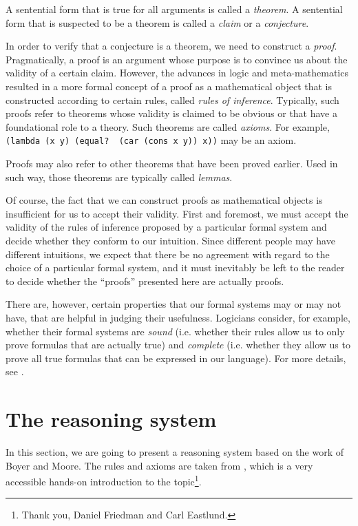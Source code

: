A sentential form that is true for all arguments is called
a \textit{theorem}. A sentential form that is suspected
to be a theorem is called a \textit{claim} or a \textit{conjecture}.

In order to verify that a conjecture is a theorem, we need to
construct a \textit{proof}. Pragmatically, a proof is an argument
whose purpose is to convince us about the validity of a certain
claim. However, the advances in logic and meta-mathematics
resulted in a more formal concept of a proof as a mathematical object
that is constructed according to certain rules, called
\textit{rules of inference}. Typically, such proofs refer to
theorems whose validity is claimed to be obvious or that have
a foundational role to a theory. Such theorems are called
\textit{axioms}. For example, \texttt{(lambda (x y) (equal?\,\,(car
  (cons x y)) x))} may be an axiom.

Proofs may also refer to other theorems that have been proved
earlier. Used in such way, those theorems are typically called
\textit{lemmas}.

Of course, the fact that we can construct proofs as mathematical
objects is insufficient for us to accept their validity. First
and foremost, we must accept the validity of the rules of inference
proposed by a particular formal system and decide whether they
conform to our intuition. Since different people may have different
intuitions, we expect that there be no agreement with regard to
the choice of a particular formal system, and it must inevitably
be left to the reader to decide whether the ``proofs'' presented
here are actually proofs.

There are, however, certain properties that our formal systems
may or may not have, that are helpful in judging their usefulness.
Logicians consider, for example, whether their formal systems
are \textit{sound} (i.e. whether their rules allow us to only
prove formulas that are actually true) and \textit{complete}
(i.e. whether they allow us to prove all true formulas that
can be expressed in our language). For more details,
see \cite{Ben-Ari2012}.

\section{The reasoning system}

In this section, we are going to present a reasoning system
based on the work of Boyer and Moore\cite{BoyerMoore1988}.
The rules and axioms are taken from \cite{FriedmanEastlund2015},
which is a very accessible hands-on introduction to the topic\footnote{
  Thank you, Daniel Friedman and Carl Eastlund.}.

